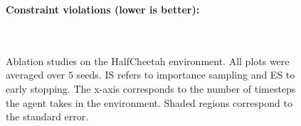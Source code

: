 \documentclass{article}
\begin{document}
\begin{figure}[h!]
\begin{center}
    \setcounter{subfigure}{0}
    \small{\bfseries Constraint violations (lower is better):}\\
    \\
    \\
    \caption{Ablation studies on the HalfCheetah environment. All plots were averaged over $5$ seeds. IS refers to importance sampling and ES to early stopping. The x-axis corresponds to the number of timesteps the agent takes in the environment. Shaded regions correspond to the standard error.}
    \label{fig:abl}
\end{center}
\vskip -0.2in
\end{figure}
\end{document}
